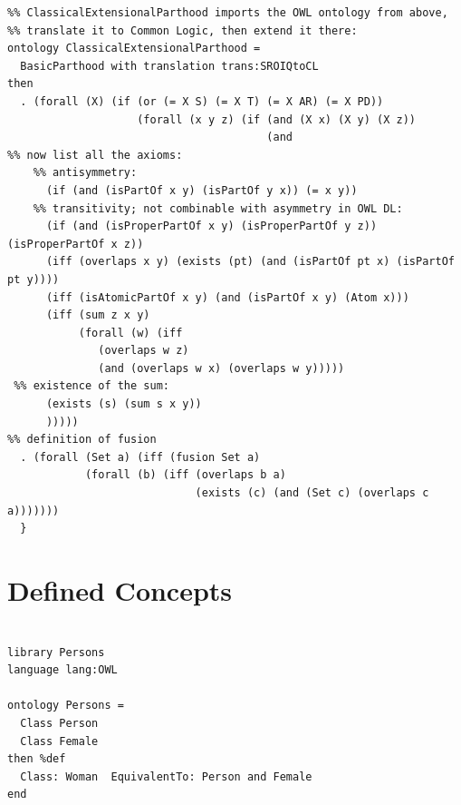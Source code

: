 \documentclass[10pt,fleqn,final]{scrreprt}
\newcommand{\sclause}[1]{\section{#1}}
\begin{document}
\begin{lstlisting}
%% ClassicalExtensionalParthood imports the OWL ontology from above, 
%% translate it to Common Logic, then extend it there:
ontology ClassicalExtensionalParthood =
  BasicParthood with translation trans:SROIQtoCL
then
  . (forall (X) (if (or (= X S) (= X T) (= X AR) (= X PD))
                    (forall (x y z) (if (and (X x) (X y) (X z))
                                        (and                          
%% now list all the axioms: 
	%% antisymmetry:
      (if (and (isPartOf x y) (isPartOf y x)) (= x y)) 
	%% transitivity; not combinable with asymmetry in OWL DL:
      (if (and (isProperPartOf x y) (isProperPartOf y z)) (isProperPartOf x z))
      (iff (overlaps x y) (exists (pt) (and (isPartOf pt x) (isPartOf pt y))))
      (iff (isAtomicPartOf x y) (and (isPartOf x y) (Atom x)))
      (iff (sum z x y)
           (forall (w) (iff 
		   	  (overlaps w z) 
			  (and (overlaps w x) (overlaps w y)))))
 %% existence of the sum:
      (exists (s) (sum s x y))                                          
      )))))
%% definition of fusion	  
  . (forall (Set a) (iff (fusion Set a)                                  
            (forall (b) (iff (overlaps b a)
                             (exists (c) (and (Set c) (overlaps c a)))))))
  }
\end{lstlisting}

\sclause{Defined Concepts}
\begin{lstlisting}[basicstyle=\ttfamily,language=dolText,morekeywords={props,ObjectProperty,Class,DisjointUnionOf,SubClassOf,Characteristics,Transitive,Asymmetric,SubPropertyOf,DisjointClasses,EquivalentTo,inverse,only,forall,iff,if,or,exists},escapechar=@,mathescape]
%prefix( lang:  <http://purl.net/DOL/languages/> )%

library Persons
language lang:OWL

ontology Persons =
  Class Person
  Class Female
then %def
  Class: Woman  EquivalentTo: Person and Female
end
\end{lstlisting}
\end{document}
